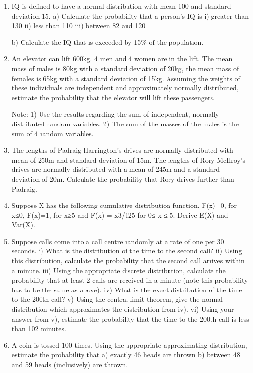 \documentclass[]{report}
\begin{document}
\begin{enumerate}	
\item IQ  is defined to have a normal distribution with mean 100 and standard deviation 15. 
	a) Calculate the probability that a person’s IQ is
	i) greater than 130
	ii) less than 110
	iii) between 82 and 120
	
	b) Calculate the IQ that is exceeded by 15\% of the population.
	
\item  An elevator can lift 600kg. 4 men and 4 women are in the lift. The mean mass of males is 80kg with a standard deviation of 20kg, the mean mass of females is 65kg with a standard deviation of 15kg. Assuming the weights of these individuals are independent and approximately normally distributed, estimate the probability that the elevator will lift these passengers. 
	
	Note: 1) Use the results regarding the sum of independent, normally distributed random variables. 
	2)	The sum of the masses of the males is the sum of 4 random variables.
	
\item 	The lengths of Padraig Harrington's drives are normally distributed with mean of 250m and standard deviation of 15m. The lengths of Rory McIlroy's drives are normally distributed with a mean of 245m and a standard deviation of 20m. Calculate the probability that Rory drives further than Padraig.
	
\item 	Suppose X has the following cumulative distribution function. F(x)=0, for x≤0, 
	F(x)=1, for x≥5 and F(x) = x3/125 for 0≤ x ≤ 5. Derive E(X) and Var(X).
	
	
	
\item  Suppose calls come into a call centre randomly at a rate of one per 30 seconds.
	i) What is the distribution of the time to the second call?
	ii) Using this distribution, calculate the probability that the second call arrives within a minute. 
	iii) Using the appropriate discrete distribution, calculate the probability that at least 2 calls are received in a minute (note this probability has to be the same as above).
	iv) What is the exact distribution of the time to the 200th call?
	v) Using the central limit theorem, give the normal distribution which approximates the distribution from iv).
	vi) Using your answer from v), estimate the probability that the time to the 200th call is less than 102 minutes.
	
\item A coin is tossed 100 times. Using the appropriate approximating distribution, estimate the probability that
	a) exactly 46 heads are thrown
	b) between 48 and 59 heads (inclusively) are thrown.

\end{enumerate}	
\newpage
\end{document}
